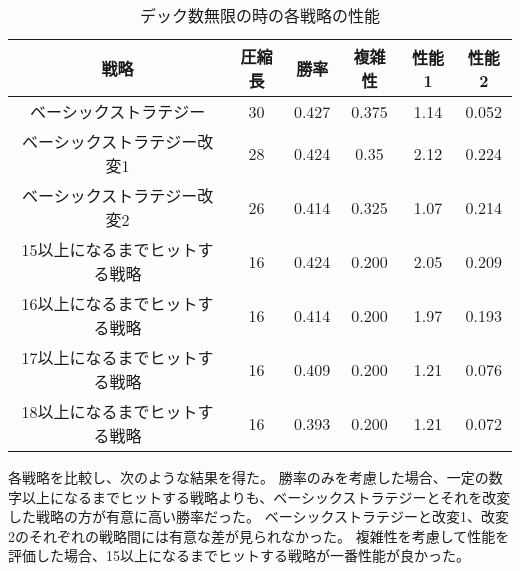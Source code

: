 
\begin{table}[H]
\caption{デック数無限の時の各戦略の性能}
\label{table:data_type}
\begin{center}
\begin{tabular}{|c|c|c|c|c|c|}
\hline
戦略           & 圧縮長 & 勝率    & 複雑性   & 性能1  & 性能2   \\ \hline
ベーシックストラテジー         & 30  & 0.427 & 0.375 & 1.14 & 0.052 \\ \hline
ベーシックストラテジー改変1      & 28  & 0.424 & 0.35  & 2.12 & 0.224 \\ \hline
ベーシックストラテジー改変2      & 26  & 0.414 & 0.325 & 1.07 & 0.214 \\ \hline
15以上になるまでヒットする戦略 & 16  & 0.424 & 0.200 & 2.05 & 0.209 \\ \hline
16以上になるまでヒットする戦略 & 16  & 0.414 & 0.200 & 1.97 & 0.193 \\ \hline
17以上になるまでヒットする戦略 & 16  & 0.409 & 0.200 & 1.21 & 0.076 \\ \hline
18以上になるまでヒットする戦略 & 16  & 0.393 & 0.200 & 1.21 & 0.072 \\ \hline
\end{tabular}
\end{center}
\end{table}

各戦略を比較し、次のような結果を得た。
勝率のみを考慮した場合、一定の数字以上になるまでヒットする戦略よりも、ベーシックストラテジーとそれを改変した戦略の方が有意に高い勝率だった。
ベーシックストラテジーと改変1、改変2のそれぞれの戦略間には有意な差が見られなかった。
複雑性を考慮して性能を評価した場合、15以上になるまでヒットする戦略が一番性能が良かった。



